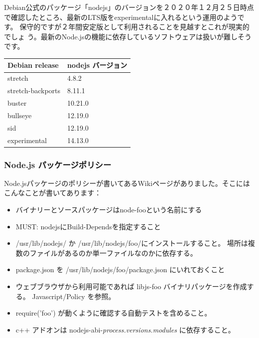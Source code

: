 \documentclass[mingoth,a4paper]{jsarticle}
\begin{document}
Debian公式のパッケージ「nodejs」のバージョンを２０２０年１２月２５日時点
で確認したところ、最新のLTS版をexperimentalに入れるという運用のようです。
保守的ですが２年間安定版として利用されることを見越すとこれが現実的でしょ
う。最新のNode.jsの機能に依存しているソフトウェアは扱いが難しそうです。

\begin{tabular}{|l|l|}
Debian release    & nodejs バージョン \\
\hline
stretch           & 4.8.2 \\
stretch-backports & 8.11.1 \\
buster            & 10.21.0 \\
bullseye          & 12.19.0 \\
sid               & 12.19.0 \\
experimental      & 14.13.0 \\
\end{tabular}

\subsubsection{Node.js パッケージポリシー}

Node.jsパッケージのポリシーが書いてあるWikiページがありました\cite{debian-nodejs-manual}。そこにはこんなことが書いてあります：

\begin{itemize}
 \item バイナリーとソースパッケージはnode-fooという名前にする

 \item MUST: nodejsにBuild-Dependsを指定すること

 \item /usr/lib/nodejs/ か /usr/lib/nodejs/foo/にインストールすること。
	場所は複数のファイルがあるのか単一ファイルなのかに依存する。
 \item package.json を /usr/lib/nodejs/foo/package.json にいれておくこと

 \item ウェブブラウザから利用可能であれば libjs-foo バイナリパッケージを作成する。 Javascript/Policy を参照。

 \item require('foo') が動くように確認する自動テストを含めること。

 \item c++ アドオンは nodejs-abi-{\it process.versions.modules} に依存すること。

\end{itemize}
\end{document}
